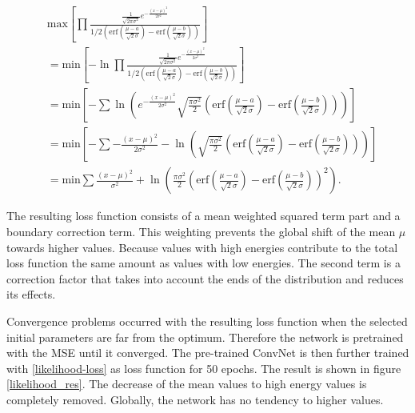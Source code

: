 \documentclass[12pt, a4paper]{thesis}
\begin{document}
\begin{align}
&\text{max}\left[ \prod \frac{\frac{1}{\sqrt{2\pi \sigma^2}}
      e^{-\frac{(x-\mu)^2}{2
          \sigma^2}}}{1/2\left(\text{erf}\left(\frac{\mu-a}{\sqrt{2}\sigma}\right)
      - \text{erf}\left(\frac{\mu-b}{\sqrt{2}\sigma}\right)\right)}
    \right]\\ &=\text{min}\left[ -\ln \prod \frac{\frac{1}{\sqrt{2\pi
          \sigma^2}} e^{-\frac{(x-\mu)^2}{2
          \sigma^2}}}{1/2\left(\text{erf}\left(\frac{\mu-a}{\sqrt{2}\sigma}\right)
      -
      \text{erf}\left(\frac{\mu-b}{\sqrt{2}\sigma}\right)\right)}\right]
  \\ &=\text{min}\left[ -\sum \ln(e^{-\frac{(x-\mu)^2}{2
        \sigma^2}}{\sqrt{\frac{\pi
          \sigma^2}{2}}\left(\text{erf}\left(\frac{\mu-a}{\sqrt{2}\sigma}\right)
      -
      \text{erf}\left(\frac{\mu-b}{\sqrt{2}\sigma}\right)\right)})\right]
  \\ &=\text{min}\left[ -\sum -\frac{(x-\mu)^2}{2
      \sigma^2}-\ln(\sqrt{\frac{\pi
        \sigma^2}{2}}\left(\text{erf}\left(\frac{\mu-a}{\sqrt{2}\sigma}\right)
    -
    \text{erf}\left(\frac{\mu-b}{\sqrt{2}\sigma}\right)\right))\right]
  \\ &=\text{min} \sum \frac{(x-\mu)^2}{\sigma^2} + \ln(\frac{\pi
    \sigma^2}{2}\left(\text{erf}\left(\frac{\mu-a}{\sqrt{2}\sigma}\right)
  -
  \text{erf}\left(\frac{\mu-b}{\sqrt{2}\sigma}\right)\right)^2). \label{likelihood-loss}
\end{align}


The resulting loss function consists of a mean weighted squared term
part and a boundary correction term. This weighting prevents the
global shift of the mean $\mu$ towards higher values. Because values
with high energies contribute to the total loss function the same
amount as values with low energies. The second term is a correction
factor that takes into account the ends of the distribution and
reduces its effects.

Convergence problems occurred with the resulting loss function
  when the selected initial parameters are far from the
  optimum. Therefore the network is pretrained with the MSE until it
  converged.  The pre-trained ConvNet is then further trained with
\eqref{likelihood-loss} as loss function for 50 epochs. The result is
shown in figure \ref{likelihood_res}. The decrease of the mean values
to high energy values is completely removed. Globally, the network has
no tendency to higher values.
\end{document}
